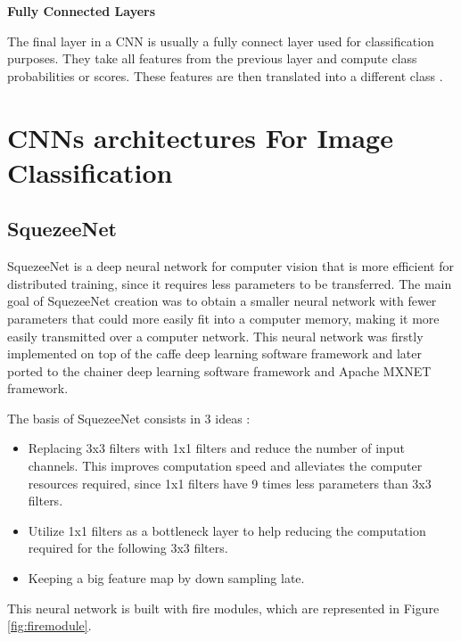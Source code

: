            \par \textbf{Fully Connected Layers}
            \par  The final layer in a CNN is usually a fully connect layer used for classification purposes. They take all features from the previous layer and compute class probabilities or scores. These features are then translated into a different class \cite{Ribeiro}.\bigbreak
            
            
\section{CNNs architectures For Image Classification}
\label{sec:cnn}
    \subsection{SquezeeNet}
    \label{SquezeeeNet}

    SquezeeNet is a deep neural network for computer vision that is more efficient for distributed training, since it requires less parameters to be transferred. The main goal of SquezeeNet creation was to obtain a smaller neural network with fewer parameters that could more easily fit into a computer memory, making it more easily transmitted over a computer network. This neural network was firstly implemented on top of the caffe deep learning software framework and later ported to the chainer deep learning software framework and Apache MXNET framework.\par
    The basis of SquezeeNet consists in 3 ideas \cite{Iandola2016}:

    \begin{itemize}
        \item Replacing 3x3 filters with 1x1 filters and reduce the number of input channels. This improves computation speed and alleviates the computer resources required, since 1x1 filters have 9 times less parameters than 3x3 filters.
        \item Utilize 1x1 filters as a bottleneck layer to help reducing the computation required for the following 3x3 filters.
        \item Keeping a big feature map by down sampling late.
    \end{itemize}

    

    This neural network is built with fire modules, which are represented in Figure \ref{fig:firemodule}. 


